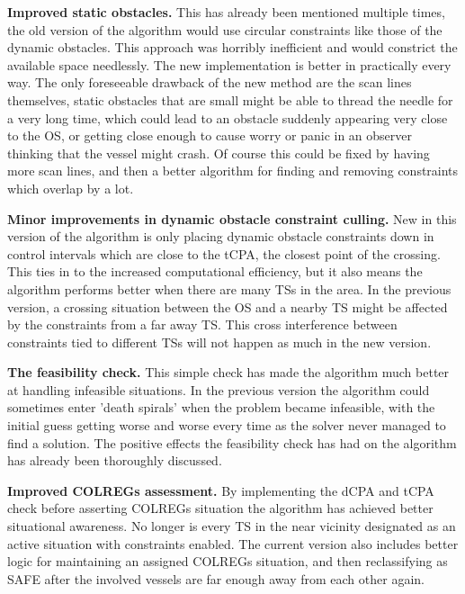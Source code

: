 \textbf{Improved static obstacles.} \newline
This has already been mentioned multiple times, the old version of the algorithm would use circular constraints like those of the dynamic
obstacles. This approach was horribly inefficient and would constrict the available space needlessly. The new implementation is better
in practically every way. The only foreseeable drawback of the new method are the scan lines themselves, static obstacles that are small might be able to thread
the needle for a very long time, which could lead to an obstacle suddenly appearing very close to the OS, or getting close enough to cause worry or panic
in an observer thinking that the vessel might crash. Of course this could be fixed by having more scan lines, and then a better algorithm for finding and removing
constraints which overlap by a lot.

\textbf{Minor improvements in dynamic obstacle constraint culling.}\newline
New in this version of the algorithm is only placing dynamic obstacle constraints down in control intervals which are
close to the tCPA, the closest point of the crossing. This ties in to the increased computational efficiency, but it also
means the algorithm performs better when there are many TSs in the area. In the previous version, a crossing situation between the OS
and a nearby TS might be affected by the constraints from a far away TS. This cross interference between constraints tied to different TSs
will not happen as much in the new version.

\textbf{The feasibility check.}\newline
This simple check has made the algorithm much better at handling infeasible situations. In the previous version the algorithm
could sometimes enter 'death spirals' when the problem became infeasible, with the initial guess getting worse and worse every time as the
solver never managed to find a solution. The positive effects the feasibility check has had on the algorithm has already been thoroughly discussed.

\textbf{Improved COLREGs assessment.}\newline
By implementing the dCPA and tCPA check before asserting COLREGs situation the algorithm has achieved better situational awareness. No longer
is every TS in the near vicinity designated as an active situation with constraints enabled. The current version also includes better logic
for maintaining an assigned COLREGs situation, and then reclassifying as SAFE after the involved vessels are far enough away from each other again.

\newpage